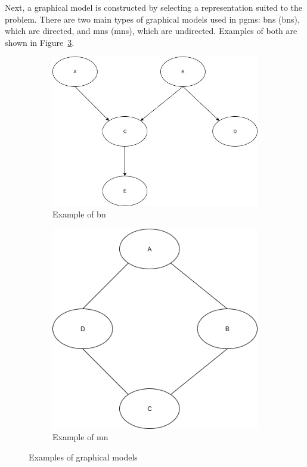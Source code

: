 \documentclass[12pt,a4paper]{article}
\begin{document}
Next, a graphical model is constructed by selecting a representation suited to the problem. There are two main types of graphical models used in \acs{pgm}s: \acl{bn}s (\acs{bn}s), which are directed, and \acl{mn}s (\acs{mn}s), which are undirected. Examples of both are shown in Figure~\ref{fig:graph_networks}.

 \begin{figure}[htbp]
 	\centering
 	\begin{subfigure}[b]{0.45\textwidth}
 		\centering
 		\includegraphics[width=\textwidth]{B_Network_Example.jpg}
 		\caption{Example of \acl{bn}}
 		\label{fig:bayesian_network}
 	\end{subfigure}
 	\hfill
 	\begin{subfigure}[b]{0.35\textwidth}
 		\centering
 		\includegraphics[width=\textwidth]{M_Network_Example.png}
 		\caption{Example of \acl{mn}}
 		\label{fig:markov_network}
 	\end{subfigure}
 	\caption{Examples of graphical models}
 	\label{fig:graph_networks}
 \end{figure}
\end{document}
